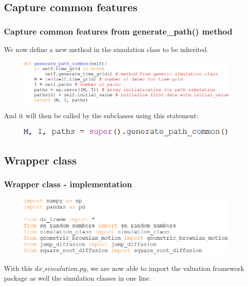 \documentclass{beamer}
\begin{document}
\subsection{Capture common features}
\begin{frame}
\frametitle{Capture common features from generate\_path() method}
We now define a new method in the simulation class to be inherited.
\begin{figure}[H]
	\includegraphics[scale=0.42]{generate_path_common.png}
\end{figure}
And it will then be called by the subclasses using this statement:
\begin{figure}[H]
	\includegraphics[scale=0.5]{call_super_generate_path_common.png}
\end{figure}
\end{frame}

\subsection{Wrapper class}

\begin{frame}
\frametitle{Wrapper class - implementation}
\begin{figure}[H]
	\includegraphics[scale=0.48]{wrapper_class.png}
\end{figure}
With this $dx\_simulation.py$, we are now able to import the valuation framework package as well the simulation classes in one line.
\end{frame}
\end{document}
